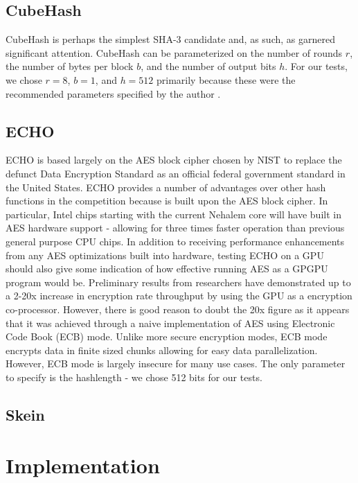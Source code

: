 \documentclass{article}
\begin{document}
\subsection*{CubeHash}

CubeHash is perhaps the simplest SHA-3 candidate and, as such, as garnered significant attention.
CubeHash can be parameterized on the number of rounds $r$, the number of bytes per block $b$, and the number of output bits $h$.
For our tests, we chose $r=8$, $b=1$, and $h=512$ primarily because these were the recommended parameters specified by the author \cite{CubeHash-spec}.

\subsection*{ECHO}
ECHO is based largely on the AES block cipher chosen by NIST to replace the defunct Data Encryption Standard as an official federal government standard in the United States.
ECHO provides a number of advantages over other hash functions in the competition because is built upon the AES block cipher.
In particular, Intel chips starting with the current Nehalem core will have built in AES hardware support - allowing for three times faster operation than previous general purpose CPU chips.\cite{Westmere}
In addition to receiving performance enhancements from any AES optimizations built into hardware, testing ECHO on a GPU should also give some indication of how effective running AES as a GPGPU program would be.
Preliminary results from researchers have demonstrated up to a 2\cite{Harrison}-20x\cite{Manavski}  increase in encryption rate throughput by using the GPU as a encryption co-processor.
However, there is good reason to doubt the 20x figure as it appears that it was achieved through a naive implementation of AES using Electronic Code Book (ECB) mode.
Unlike more secure encryption modes, ECB mode encrypts data in finite sized chunks allowing for easy data parallelization.  
However, ECB mode is largely insecure for many use cases.\cite{CodeBook}
The only parameter to specify is the hashlength - we chose 512 bits for our tests.

\subsection*{Skein}



\section*{Implementation}
\end{document}
